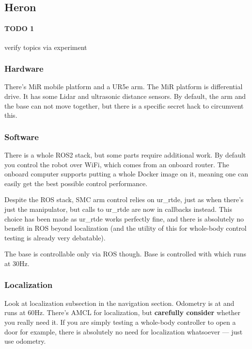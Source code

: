 \subsection{Heron}
\paragraph{TODO 1} verify topics via experiment

\subsubsection{Hardware}
There's MiR mobile platform and a UR5e arm. The MiR platform is differential drive.
It has some Lidar and ultrasonic distance sensors. By default, the arm and the base
can not move together, but there is a specific secret hack to circumvent this.

\subsubsection{Software}
There is a whole ROS2 stack, but some parts require additional work. 
By default you control the robot over WiFi, which comes from an onboard router.
The onboard computer supports putting a whole Docker image on it,
meaning one can easily get the best possible control performance.

Despite the ROS stack, SMC arm control relies on ur\_rtde, just as when there's just the manipulator, 
but calls to ur\_rtde are now in callbacks instead.
This choice has been made as ur\_rtde works perfectly fine, and there is
absolutely no benefit in ROS beyond localization (and the utility of this
for whole-body control testing is already very debatable).

The base is controllable only via ROS though.
Base is controlled with  which runs at 30Hz.

\subsubsection{Localization}
Look at localization subsection in the navigation section.
Odometry is at  and runs at 60Hz.
There's AMCL for localization, but \textbf{carefully consider} whether you really need it.
If you are simply testing a whole-body controller to open a door for example,
there is absolutely no need for localization whatsoever --- just use odometry.
